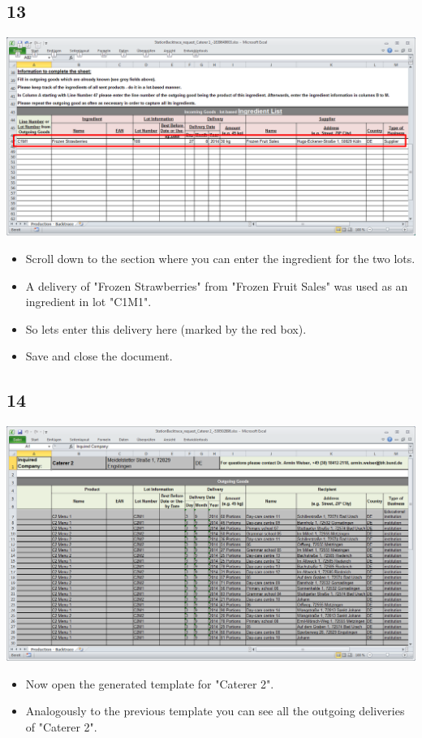 \documentclass{beamer}
\begin{document}
\subsection{13}
\begin{frame}
	\begin{center}
  		\includegraphics[height=0.5\textheight]{13.png}
	\end{center}
	\begin{itemize}
		\item Scroll down to the section where you can enter the ingredient for the two lots.
		\item A delivery of "Frozen Strawberries" from "Frozen Fruit Sales" was used as an ingredient in lot "C1M1".
		\item So lets enter this delivery here (marked by the red box).
		\item Save and close the document.
	\end{itemize}
\end{frame}

\subsection{14}
\begin{frame}
	\begin{center}
  		\includegraphics[height=0.6\textheight]{14.png}
	\end{center}
	\begin{itemize}
		\item Now open the generated template for "Caterer 2".
		\item Analogously to the previous template you can see all the outgoing deliveries of "Caterer 2".
	\end{itemize}
\end{frame}
\end{document}
